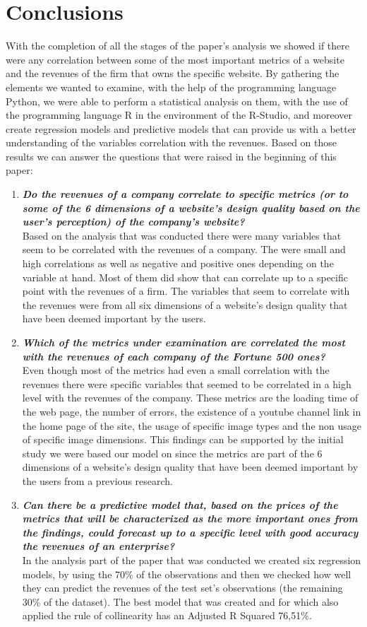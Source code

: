 \documentclass{book}
\begin{document}
\chapter{Conclusions}
With the completion of all the stages of the paper's analysis we showed if there were any correlation between some of the most important metrics of a website and the revenues of the firm that owns the specific website. By gathering the elements we wanted to examine, with the help of the programming language Python, we were able to perform a statistical analysis on them, with the use of the programming language R in the environment of the R-Studio, and moreover create regression models and predictive models that can provide us with a better understanding of the variables correlation with the revenues. Based on those results we can answer the questions that were raised in the beginning of this paper:
\begin{enumerate}
\item \textbf{\textit{Do the revenues of a company correlate to specific metrics (or to some of the 6 dimensions of a website's design quality based on the user's perception) of the company's website?}}\\
Based on the analysis that was conducted there were many variables that seem to be correlated with the revenues of a company. The were small and high correlations as well as negative and positive ones depending on the variable at hand. Most of them did show that can correlate up to a specific point with the revenues of a firm. The variables that seem to correlate with the revenues were from all six dimensions of a website's design quality that have been deemed important by the users.
\item \textbf{\textit{Which of the metrics under examination are correlated the most with the revenues of each company of the Fortune 500 ones?}}\\
Even though most of the metrics had even a small correlation with the revenues there were specific variables that seemed to be correlated in a high level with the revenues of the company. These metrics are the loading time of the web page, the number of errors, the existence of a youtube channel link in the home page of the site, the usage of specific image types and the non usage of specific image dimensions. This findings can be supported by the initial study we were based our model on since the metrics are part of the 6 dimensions of a website's design quality that have been deemed important by the users from a previous research.\cite{key9}
\item \textbf{\textit{Can there be a predictive model that, based on the prices of the metrics that will be characterized as the more important ones from the findings, could forecast up to a specific level with good accuracy the revenues of an enterprise?}}\\
In the analysis part of the paper that was conducted we created six regression models, by using the 70\% of the observations and then we checked how well they can predict the revenues of the test set's observations (the remaining 30\% of the dataset). The best model that was created and for which also applied the rule of collinearity has an Adjusted R Squared 76,51\%.
\end{enumerate}
\end{document}
